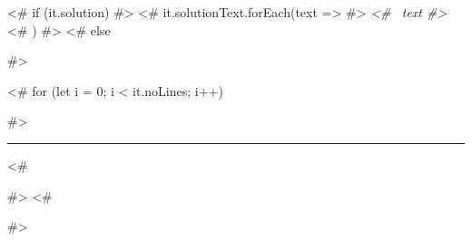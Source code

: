 
<# if (it.solution) { #>
<# it.solutionText.forEach(text => { #>
{\color{red}\normalfont\itshape <#~ text #> \phantom{0.1mm}\newline}
<# }) #>
<# } else { #>

<# for (let i = 0; i < it.noLines; i++) { #>
\phantom{0.1mm}\newline
\vspace{-2mm}
\rule{\linewidth}{0.2mm}
<# } #>
\vspace{-2mm}
<# } #>
